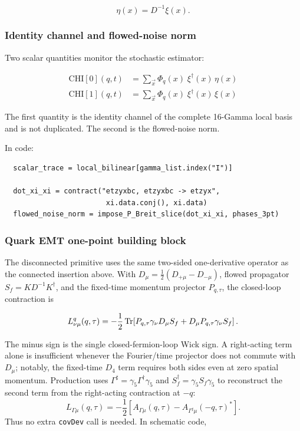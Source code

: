 \documentclass[11pt,a4paper]{article}
\newcommand{\code}[1]{\texttt{#1}}
\begin{document}
\begin{equation}\label{eq:eta_noise}
  \eta(x) = D^{-1} \xi(x).
\end{equation}

\subsubsection{Identity channel and flowed-noise norm}

Two scalar quantities monitor the stochastic estimator:

\begin{align}
  \text{CHI}[0](q, t) &= \sum_{\vec{x}} \Phi_q(x)\;
    \xi^\dagger(x)\, \eta(x)
    \label{eq:CHI0}
    \\
  \text{CHI}[1](q, t) &= \sum_{\vec{x}} \Phi_q(x)\;
    \xi^\dagger(x)\, \xi(x)
    \label{eq:CHI1}
\end{align}

The first quantity is the identity channel of the complete 16-Gamma local
basis and is not duplicated.  The second is the flowed-noise norm.

In code:
\begin{verbatim}
  scalar_trace = local_bilinear[gamma_list.index("I")]

  dot_xi_xi = contract("etzyxbc, etzyxbc -> etzyx",
                        xi.data.conj(), xi.data)
  flowed_noise_norm = impose_P_Breit_slice(dot_xi_xi, phases_3pt)
\end{verbatim}

\subsubsection{Quark EMT one-point building block}

The disconnected primitive uses the same two-sided one-derivative operator as
the connected insertion above.  With
$D_\mu=\tfrac12(D_{+\mu}-D_{-\mu})$, flowed propagator
$S_f=K D^{-1}K^\dagger$, and the fixed-time momentum projector
$P_{q,\tau}$, the closed-loop contraction is

\begin{equation}\label{eq:Tmunu_1pt_stoch}
  L_{\nu\mu}^q(q,\tau)
  =-\frac12\Tr\!\left[
    P_{q,\tau}\gamma_\nu D_\mu S_f
    +D_\mu P_{q,\tau}\gamma_\nu S_f
  \right].
\end{equation}

The minus sign is the single closed-fermion-loop Wick sign.  A right-acting
term alone is insufficient whenever the Fourier/time projector does not
commute with $D_\mu$; notably, the fixed-time $D_4$ term requires both sides
even at zero spatial momentum.  Production uses
$\Gamma^\sharp=\gamma_5\Gamma^\dagger\gamma_5$ and
$S_f^\dagger=\gamma_5S_f\gamma_5$ to reconstruct the second term from the
right-acting contraction at $-q$:
\begin{equation}
 L_{\Gamma\mu}(q,\tau)
 =-\frac12\left[A_{\Gamma\mu}(q,\tau)
 -A_{\Gamma^\sharp\mu}(-q,\tau)^*\right].
\end{equation}
Thus no extra \code{covDev} call is needed.  In schematic code,
\end{document}
